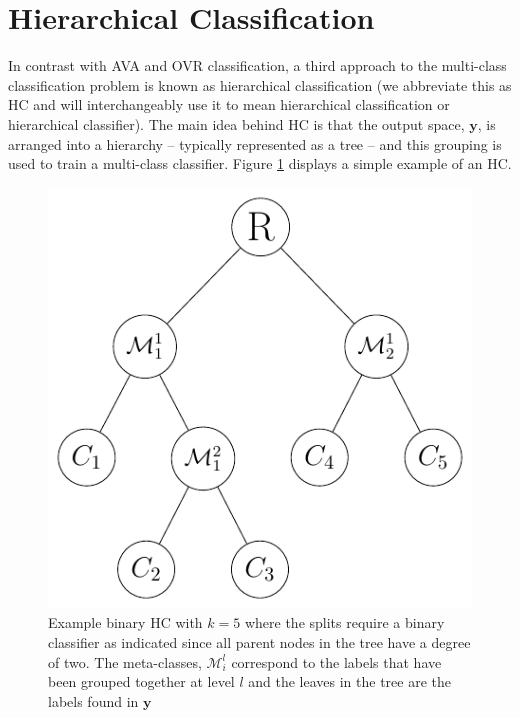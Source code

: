 \documentclass[../thesis.tex]{subfiles}
\begin{document}
\section{Hierarchical Classification}
In contrast with AVA and OVR classification, a third approach to the multi-class
classification problem is known as hierarchical classification (we abbreviate
this as HC and will interchangeably use it to mean hierarchical classification
or hierarchical classifier). The main idea behind HC is that the output space,
$\mathbf{y}$, is arranged into a hierarchy -- typically represented as a tree --
and this grouping is used to train a multi-class classifier. Figure
\ref{fig:bin_hc} displays a simple example of an HC.
\begin{figure}
    \centering
    \includegraphics{images/bin_hc.pdf}

    \caption[Example Binary Hierarchical Classifier]{Example binary HC with
    $k = 5$ where the splits require a binary classifier as
    indicated since all parent nodes in the tree have a degree of two. The
    meta-classes, $\mathcal{M}_i^l$ correspond to the labels that have been
    grouped together at level $l$ and the leaves in the tree are the labels
    found in $\mathbf{y}$}

    \label{fig:bin_hc}
\end{figure}
\end{document}

